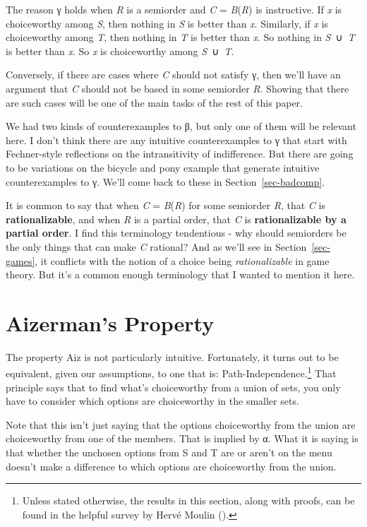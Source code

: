 \documentclass[
  11pt,
  letterpaper,
  DIV=11,
  numbers=noendperiod,
  twoside]{scrartcl}
\begin{document}
The reason γ holds when \emph{R} is a semiorder and \emph{C} =
\emph{B}(\emph{R}) is instructive. If \emph{x} is choiceworthy among
\emph{S}, then nothing in \emph{S} is better than \emph{x}. Similarly,
if \emph{x} is choiceworthy among \emph{T}, then nothing in \emph{T} is
better than \emph{x}. So nothing in \emph{S}~∪~\emph{T} is better than
\emph{x}. So \emph{x} is choiceworthy among \emph{S}~∪~\emph{T}.

Conversely, if there are cases where \emph{C} should not satisfy γ, then
we'll have an argument that \emph{C} should not be based in some
semiorder \emph{R}. Showing that there are such cases will be one of the
main tasks of the rest of this paper.

We had two kinds of counterexamples to β, but only one of them will be
relevant here. I don't think there are any intuitive counterexamples to
γ that start with Fechner-style reflections on the intransitivity of
indifference. But there are going to be variations on the bicycle and
pony example that generate intuitive counterexamples to γ. We'll come
back to these in Section~\ref{sec-badcomp}.

It is common to say that when \emph{C} = \emph{B}(\emph{R}) for some
semiorder \emph{R}, that \emph{C} is \textbf{rationalizable}, and when
\emph{R} is a partial order, that \emph{C} is \textbf{rationalizable by
a partial order}. I find this terminology tendentious - why should
semiorders be the only things that can make \emph{C} rational? And as
we'll see in Section~\ref{sec-games}, it conflicts with the notion of a
choice being \emph{rationalizable} in game theory. But it's a common
enough terminology that I wanted to mention it here.

\section{Aizerman's Property}\label{sec-aiz}

The property Aiz is not particularly intuitive. Fortunately, it turns
out to be equivalent, given our assumptions, to one that is:
Path-Independence.\footnote{Unless stated otherwise, the results in this
  section, along with proofs, can be found in the helpful survey by
  Hervé Moulin ().} That principle says
that to find what's choiceworthy from a union of sets, you only have to
consider which options are choiceworthy in the smaller sets.

Note that this isn't just saying that the options choiceworthy from the
union are choiceworthy from one of the members. That is implied by α.
What it is saying is that whether the unchosen options from S and T are
or aren't on the menu doesn't make a difference to which options are
choiceworthy from the union.
\end{document}
